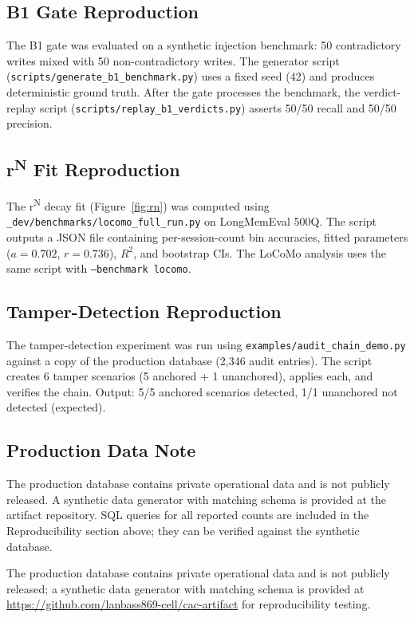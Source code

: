 \documentclass{article}
\begin{document}
\subsection{B1 Gate Reproduction}

The B1 gate was evaluated on a synthetic injection benchmark: 50 contradictory writes mixed with 50 non-contradictory writes. The generator script (\texttt{scripts/generate\_b1\_benchmark.py}) uses a fixed seed (42) and produces deterministic ground truth. After the gate processes the benchmark, the verdict-replay script (\texttt{scripts/replay\_b1\_verdicts.py}) asserts 50/50 recall and 50/50 precision.

\subsection{r\textsuperscript{N} Fit Reproduction}

The r\textsuperscript{N} decay fit (Figure~\ref{fig:rn}) was computed using \texttt{\_dev/benchmarks/locomo\_full\_run.py} on LongMemEval 500Q. The script outputs a JSON file containing per-session-count bin accuracies, fitted parameters ($a = 0.702$, $r = 0.736$), $R^2$, and bootstrap CIs. The LoCoMo analysis uses the same script with \texttt{--benchmark locomo}.

\subsection{Tamper-Detection Reproduction}

The tamper-detection experiment was run using \texttt{examples/audit\_chain\_demo.py} against a copy of the production database (2{,}346 audit entries). The script creates 6 tamper scenarios (5 anchored + 1 unanchored), applies each, and verifies the chain. Output: 5/5 anchored scenarios detected, 1/1 unanchored not detected (expected).

\subsection{Production Data Note}

The production database contains private operational data and is not publicly released. A synthetic data generator with matching schema is provided at the artifact repository. SQL queries for all reported counts are included in the Reproducibility section above; they can be verified against the synthetic database.


The production database contains private operational data and is not publicly released; a synthetic data generator with matching schema is provided at \url{https://github.com/lanbass869-cell/cac-artifact} for reproducibility testing.
\end{document}
